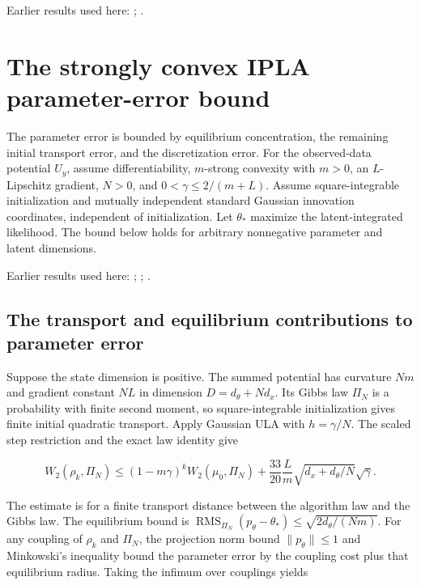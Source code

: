 \documentclass[11pt,a4paper]{report}
\begin{document}
Earlier results used here: \cite[Section~3.17.4]{LangevinLean2026ULASC}; \cite[Section~3.51.3]{LangevinLean2026ULASC}.
\section{\texorpdfstring{The strongly convex IPLA parameter-error bound}{The strongly convex IPLA parameter-error bound}}
\label{proof-module-IPLA-Theorem-lean}


The parameter error is bounded by equilibrium concentration, the remaining initial transport error, and the discretization error. For the observed-data potential \(U_y\), assume differentiability, \(m\)-strong convexity with \(m>0\), an \(L\)-Lipschitz gradient, \(N>0\), and \(0<\gamma\le2/(m+L)\). Assume square-integrable initialization and mutually independent standard Gaussian innovation coordinates, independent of initialization. Let \(\theta_*\) maximize the latent-integrated likelihood. The bound below holds for arbitrary nonnegative parameter and latent dimensions.



Earlier results used here: \cite[Section~3.50]{LangevinLean2026ULASC}; \cite[Section~3.52]{LangevinLean2026ULASC}; \cite[Section~3.53]{LangevinLean2026ULASC}.
\subsection{\texorpdfstring{The transport and equilibrium contributions to parameter error}{The transport and equilibrium contributions to parameter error}}
\label{report-step-IPLA-Theorem-lean-1}


Suppose the state dimension is positive. The summed potential has curvature \(Nm\) and gradient constant \(NL\) in dimension \(D=d_\theta+Nd_x\). Its Gibbs law \(\Pi_N\) is a probability with finite second moment, so square-integrable initialization gives finite initial quadratic transport. Apply Gaussian ULA with \(h=\gamma/N\). The scaled step restriction and the exact law identity give

\[W_2(\rho_k,\Pi_N)\le(1-m\gamma)^kW_2(\mu_0,\Pi_N)+\frac{33}{20}\frac Lm\sqrt{d_x+d_\theta/N}\sqrt\gamma.\]

The estimate is for a finite transport distance between the algorithm law and the Gibbs law. The equilibrium bound is \(\operatorname{RMS}_{\Pi_N}(p_\theta-\theta_*)\le\sqrt{2d_\theta/(Nm)}\). For any coupling of \(\rho_k\) and \(\Pi_N\), the projection norm bound \(\|p_\theta\|\le1\) and Minkowski’s inequality bound the parameter error by the coupling cost plus that equilibrium radius. Taking the infimum over couplings yields
\end{document}
